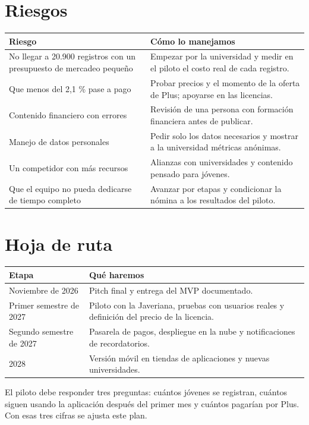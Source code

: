 \documentclass[11pt,a4paper]{article}
\begin{document}
\section{Riesgos}

\begin{tabularx}{\textwidth}{Y Y}
  \toprule
  \textbf{Riesgo} & \textbf{Cómo lo manejamos} \\
  \midrule
  No llegar a 20.900 registros con un presupuesto de mercadeo pequeño & Empezar por la universidad y medir en el piloto el costo real de cada registro. \\
  Que menos del 2,1 \% pase a pago & Probar precios y el momento de la oferta de Plus; apoyarse en las licencias. \\
  Contenido financiero con errores & Revisión de una persona con formación financiera antes de publicar. \\
  Manejo de datos personales & Pedir solo los datos necesarios y mostrar a la universidad métricas anónimas. \\
  Un competidor con más recursos & Alianzas con universidades y contenido pensado para jóvenes. \\
  Que el equipo no pueda dedicarse de tiempo completo & Avanzar por etapas y condicionar la nómina a los resultados del piloto. \\
  \bottomrule
\end{tabularx}

\section{Hoja de ruta}

\begin{tabularx}{\textwidth}{P{4.2cm} Y}
  \toprule
  \textbf{Etapa} & \textbf{Qué haremos} \\
  \midrule
  Noviembre de 2026 & Pitch final y entrega del MVP documentado. \\
  Primer semestre de 2027 & Piloto con la Javeriana, pruebas con usuarios reales y definición del precio de la licencia. \\
  Segundo semestre de 2027 & Pasarela de pagos, despliegue en la nube y notificaciones de recordatorios. \\
  2028 & Versión móvil en tiendas de aplicaciones y nuevas universidades. \\
  \bottomrule
\end{tabularx}

El piloto debe responder tres preguntas: cuántos jóvenes se registran, cuántos siguen usando la aplicación después del primer mes y cuántos pagarían por Plus. Con esas tres cifras se ajusta este plan.
\end{document}
